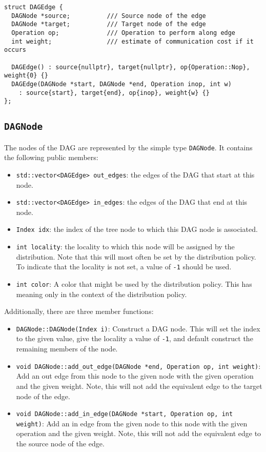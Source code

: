 \begin{verbatim}
struct DAGEdge {
  DAGNode *source;          /// Source node of the edge
  DAGNode *target;          /// Target node of the edge
  Operation op;             /// Operation to perform along edge
  int weight;               /// estimate of communication cost if it occurs

  DAGEdge() : source{nullptr}, target{nullptr}, op{Operation::Nop}, weight{0} {}
  DAGEdge(DAGNode *start, DAGNode *end, Operation inop, int w)
    : source{start}, target{end}, op{inop}, weight{w} {}
};
\end{verbatim}

\subsection{\texttt{DAGNode}}

The nodes of the DAG are represented by the simple type \texttt{DAGNode}. It
contains the following public members:

\begin{itemize}
  \item \texttt{std::vector<DAGEdge> out_edges}: the edges of the DAG that
    start at this node.
  \item \texttt{std::vector<DAGEdge> in_edges}: the edges of the DAG that end
    at this node.
  \item \texttt{Index idx}: the index of the tree node to which this DAG node
    is associated.
  \item \texttt{int locality}: the locality to which this node will be assigned
    by the distribution. Note that this will most often be set by the
    distribution policy. To indicate that the locality is not set, a value of
    \texttt{-1} should be used.
  \item \texttt{int color}: A color that might be used by the distribution
    policy. This has meaning only in the context of the distribution policy.
\end{itemize}

\noindent Additionally, there are three member functions:\

\begin{itemize}
  \item \texttt{DAGNode::DAGNode(Index i)}: Construct a DAG node. This will set
    the index to the given value, give the locality a value of \texttt{-1}, and
    default construct the remaining members of the node.
  \item \texttt{void DAGNode::add_out_edge(DAGNode *end, Operation op,
    int weight)}: Add an out edge from this node to the given node with the
    given operation and the given weight. Note, this will not add the equivalent
    edge to the target node of the edge.
  \item \texttt{void DAGNode::add_in_edge(DAGNode *start, Operation op,
    int weight)}: Add an in edge from the given node to this node with the
    given operation and the given weight. Note, this will not add the equivalent
    edge to the source node of the edge.
\end{itemize}

